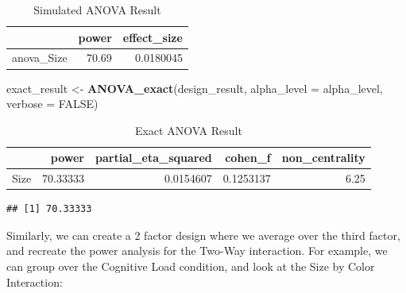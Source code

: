 \documentclass[]{book}
\newenvironment{Shaded}{\begin{snugshade}}{\end{snugshade}}
\newcommand{\CommentTok}[1]{\textcolor[rgb]{0.56,0.35,0.01}{\textit{#1}}}
\newcommand{\DataTypeTok}[1]{\textcolor[rgb]{0.13,0.29,0.53}{#1}}
\newcommand{\KeywordTok}[1]{\textcolor[rgb]{0.13,0.29,0.53}{\textbf{#1}}}
\newcommand{\NormalTok}[1]{#1}
\newcommand{\OperatorTok}[1]{\textcolor[rgb]{0.81,0.36,0.00}{\textbf{#1}}}
\newcommand{\OtherTok}[1]{\textcolor[rgb]{0.56,0.35,0.01}{#1}}
\newcommand{\StringTok}[1]{\textcolor[rgb]{0.31,0.60,0.02}{#1}}
\begin{document}
\begin{table}[!h]

\caption{\label{tab:unnamed-chunk-215}Simulated ANOVA Result}
\centering
\begin{tabular}{l|r|r}
\hline
  & power & effect\_size\\
\hline
anova\_Size & 70.69 & 0.0180045\\
\hline
\end{tabular}
\end{table}

\begin{Shaded}
\begin{Highlighting}[]
\NormalTok{exact_result <-}\StringTok{ }\KeywordTok{ANOVA_exact}\NormalTok{(design_result,}
                            \DataTypeTok{alpha_level =}\NormalTok{ alpha_level,}
                            \DataTypeTok{verbose =} \OtherTok{FALSE}\NormalTok{)}
\end{Highlighting}
\end{Shaded}

\begin{table}[!h]

\caption{\label{tab:unnamed-chunk-217}Exact ANOVA Result}
\centering
\begin{tabular}{l|r|r|r|r}
\hline
  & power & partial\_eta\_squared & cohen\_f & non\_centrality\\
\hline
Size & 70.33333 & 0.0154607 & 0.1253137 & 6.25\\
\hline
\end{tabular}
\end{table}

\begin{Shaded}
\end{Shaded}

\begin{verbatim}
## [1] 70.33333
\end{verbatim}

Similarly, we can create a 2 factor design where we average over the third factor, and recreate the power analysis for the Two-Way interaction. For example, we can group over the Cognitive Load condition, and look at the Size by Color Interaction:
\end{document}
